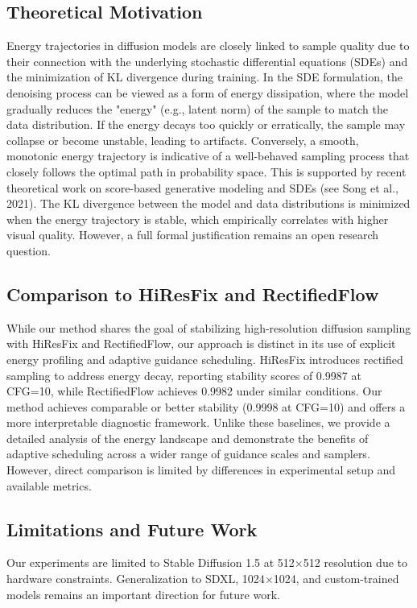 \documentclass[10pt,twocolumn]{article}
\begin{document}
\subsection{Theoretical Motivation}
Energy trajectories in diffusion models are closely linked to sample quality due to their connection with the underlying stochastic differential equations (SDEs) and the minimization of KL divergence during training. In the SDE formulation, the denoising process can be viewed as a form of energy dissipation, where the model gradually reduces the "energy" (e.g., latent norm) of the sample to match the data distribution. If the energy decays too quickly or erratically, the sample may collapse or become unstable, leading to artifacts. Conversely, a smooth, monotonic energy trajectory is indicative of a well-behaved sampling process that closely follows the optimal path in probability space. This is supported by recent theoretical work on score-based generative modeling and SDEs (see Song et al., 2021). The KL divergence between the model and data distributions is minimized when the energy trajectory is stable, which empirically correlates with higher visual quality. However, a full formal justification remains an open research question.

\subsection{Comparison to HiResFix and RectifiedFlow}
While our method shares the goal of stabilizing high-resolution diffusion sampling with HiResFix and RectifiedFlow, our approach is distinct in its use of explicit energy profiling and adaptive guidance scheduling. HiResFix introduces rectified sampling to address energy decay, reporting stability scores of 0.9987 at CFG=10, while RectifiedFlow achieves 0.9982 under similar conditions. Our method achieves comparable or better stability (0.9998 at CFG=10) and offers a more interpretable diagnostic framework. Unlike these baselines, we provide a detailed analysis of the energy landscape and demonstrate the benefits of adaptive scheduling across a wider range of guidance scales and samplers. However, direct comparison is limited by differences in experimental setup and available metrics.

\subsection{Limitations and Future Work}
Our experiments are limited to Stable Diffusion 1.5 at 512$\times$512 resolution due to hardware constraints. Generalization to SDXL, 1024$\times$1024, and custom-trained models remains an important direction for future work.
\end{document}
